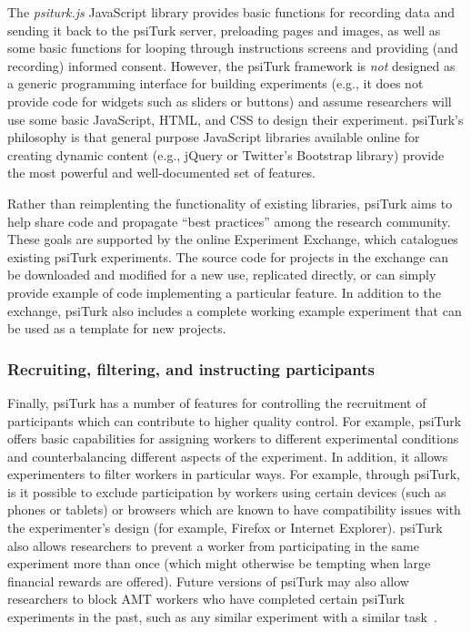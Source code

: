 \documentclass[twocolumn]{svjour3}          %
\newcommand{\psiturk}[0]{\textsf{psiTurk}}
\newcommand{\psiturkjs}[0]{\emph{psiturk.js}}
\begin{document}
The \psiturkjs{} JavaScript library provides basic functions for recording data and sending it back to the \psiturk{} server,
preloading pages and images, as well as some basic functions for looping through instructions
screens and providing (and recording) informed consent.
However, the \psiturk{} framework is \emph{not} designed as a generic
programming interface for building 
experiments (e.g., it does not provide code for widgets such as sliders or buttons) and assume
researchers will use some basic JavaScript, HTML, and CSS to design their experiment.  \psiturk{}'s
philosophy is that general purpose JavaScript libraries available online for creating dynamic content (e.g., jQuery or
Twitter's Bootstrap library) provide the most powerful and well-documented set of features.  

Rather than reimplenting the functionality of existing libraries, \psiturk{} aims to help share code and propagate ``best practices'' among the research community.
These goals are supported by the online Experiment Exchange, which catalogues existing \psiturk{} experiments. The source code for projects in the exchange can be downloaded and modified for a new use,
replicated directly, or can simply provide example of code implementing a particular 
feature.  In addition to the exchange, \psiturk{} also includes a complete working example 
experiment that can be used as a template for new projects.



\subsubsection{Recruiting, filtering, and instructing participants}
Finally, \psiturk{} has a number of features for controlling the recruitment
of participants which can contribute to higher quality control.
For example, \psiturk{} offers basic capabilities for assigning workers to different experimental conditions 
and counterbalancing different aspects of the experiment.
In addition, it allows experimenters to filter workers in particular ways.  For example, through \psiturk{},
is it possible to exclude participation by workers using certain devices (such as phones or tablets) or browsers
which are known to have compatibility issues with the experimenter's design (for example,
Firefox or Internet Explorer).  \psiturk{} also allows researchers to prevent a worker from 
participating in the same experiment more than once (which might otherwise be tempting when
large financial rewards are offered).  Future versions of \psiturk{} may also allow researchers to 
block AMT workers who have completed certain \psiturk{} experiments in the past, such as
any similar experiment with a similar task~\citep[see][for a discussion about non-naivety amongst AMT workers]{chandler2014nonnaivete}.
\end{document}
